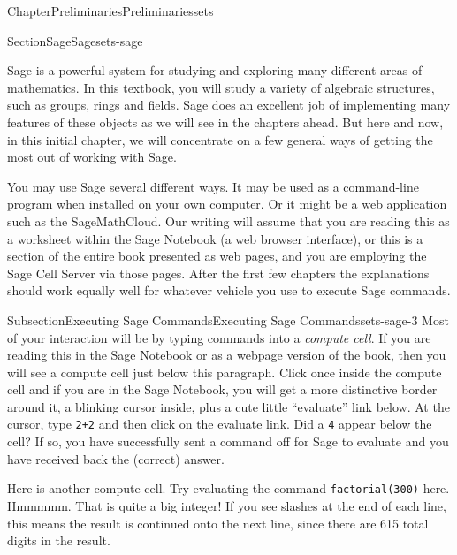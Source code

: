 \documentclass[oneside,10pt,]{book}
\newcommand{\mono}[1]{\texttt{#1}}
\numberwithin{equation}{section}
\begin{document}
\begin{chapterptx}{Chapter}{Preliminaries}{}{Preliminaries}{}{}{sets}
%
%
\typeout{************************************************}
\typeout{************************************************}
%
\begin{sectionptx}{Section}{Sage}{}{Sage}{}{}{sets-sage}
\begin{introduction}{}%
Sage is a powerful system for studying and exploring many different areas of mathematics.  In this textbook, you will study a variety of algebraic structures, such as groups, rings and fields.  Sage does an excellent job of implementing many features of these objects as we will see in the chapters ahead.  But here and now, in this initial chapter, we will concentrate on a few general ways of getting the most out of working with Sage.%
\par
You may use Sage several different ways.  It may be used as a command-line program when installed on your own computer.  Or it might be a web application such as the SageMathCloud.  Our writing will assume that you are reading this as a worksheet within the Sage Notebook (a web browser interface), or this is a section of the entire book presented as web pages, and you are employing the Sage Cell Server via those pages.  After the first few chapters the explanations should work equally well for whatever vehicle you use to execute Sage commands.%
\end{introduction}%
%
%
\typeout{************************************************}
\typeout{************************************************}
%
\begin{subsectionptx}{Subsection}{Executing Sage Commands}{}{Executing Sage Commands}{}{}{sets-sage-3}
Most of your interaction will be by typing commands into a \emph{compute cell}.  If you are reading this in the Sage Notebook or as a webpage version of the book, then you will see a compute cell just below this paragraph.  Click once inside the compute cell and if you are in the Sage Notebook, you will get a more distinctive border around it, a blinking cursor inside, plus a cute little ``evaluate'' link below.%
At the cursor, type \mono{2+2} and then click on the evaluate link.  Did a \mono{4} appear below the cell?  If so, you have successfully sent a command off for Sage to evaluate and you have received back the (correct) answer.%
\par
Here is another compute cell.  Try evaluating the command \mono{factorial(300)} here.%
Hmmmmm.  That is quite a big integer!  If you see slashes at the end of each line, this means the result is continued onto the next line, since there are 615 total digits in the result.%

\end{subsectionptx}
\end{sectionptx}
\end{chapterptx}
\end{document}
